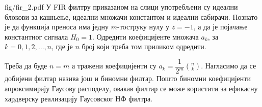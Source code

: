 
\begin{slikaDesno}{fig/fir_2.pdf}
    \PID У FIR филтру приказаном на слици употребљени су идеални блокови за кашњење, идеални множачи константом и идеални сабирачи.
    Познато је да функција преноса има једну $m$-тоструку нулу у $z = -1$, а да је појачање константног сигнала $H_0 = 1$. 
    Одредити коефицијенте множача $a_k$, за $k = 0,1,2,\ldots,n$, где је $n$ број који треба том 
    приликом одредити.
\end{slikaDesno}

\REZULTAT
Треба да буде $n=m$ а тражени коефицијенти су $a_k = \dfrac{1}{2^m} \binom{n}{k}$.
Нагласимо да се добијени филтар назива још и биномни филтар. Пошто биномни коефицијенти апроксимирају Гаусову расподелу, овакав филтар се може 
користити за ефикасну хардверску реализацију Гаусовског НФ филтра.